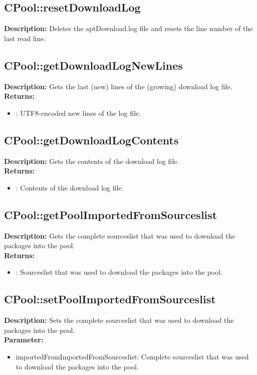 \subsection{CPool::resetDownloadLog}
\textbf{Description:} Deletes the aptDownload.log file and resets the line number of the last read line.\\

\subsection{CPool::getDownloadLogNewLines}
\textbf{Description:} Gets the last (new) lines of the (growing) download log file.\\
\textbf{Returns:}
\begin{itemize}
\item : UTF8-encoded new lines of the log file.
\end{itemize}

\subsection{CPool::getDownloadLogContents}
\textbf{Description:} Gets the contents of the download log file.\\
\textbf{Returns:}
\begin{itemize}
\item : Contents of the download log file.
\end{itemize}

\subsection{CPool::getPoolImportedFromSourceslist}
\textbf{Description:} Gets the complete sourceslist that was used to download the packages into the pool.\\
\textbf{Returns:}
\begin{itemize}
\item : Sourceslist that was used to download the packages into the pool.
\end{itemize}

\subsection{CPool::setPoolImportedFromSourceslist}
\textbf{Description:} Sets the complete sourceslist that was used to download the packages into the pool.\\
\textbf{Parameter:}
\begin{itemize}
\item importedFromImportedFromSourceslist: Complete sourceslist that was used to download the packages into the pool.
\end{itemize}


